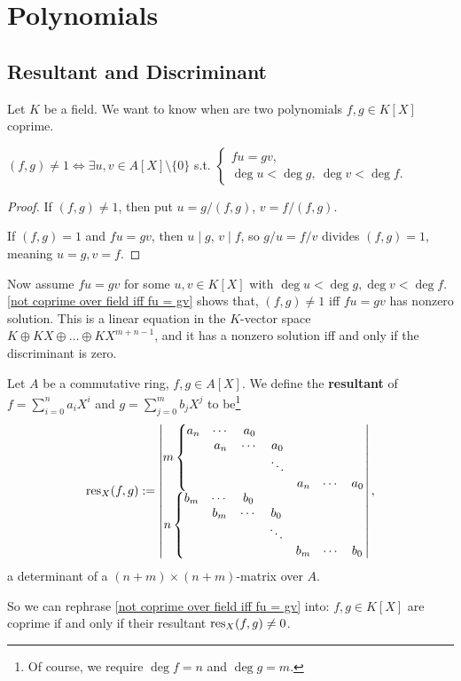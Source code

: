 \section{Polynomials}

\subsection{Resultant and Discriminant}
Let $K$ be a field.
We want to know when are two polynomials $f, g\in K[X]$ coprime.
\begin{lemma}\label{not coprime over field iff fu = gv}
    $(f, g)\ne 1\iff \exists u, v\in A[X]\setminus \{0\}$ s.t. \(\begin{cases}
        fu = gv,\\ 
        \deg u <\deg g,\ \deg v < \deg f.
    \end{cases}\)
\end{lemma}
\begin{proof}
    If $(f, g) \ne 1$, then put $u = g/(f, g)$, $v = f/(f, g)$.

    If $(f, g) = 1$ and $fu = gv$, then $u\mid g$, $v\mid f$, so $g/u = f/v$ divides $(f, g) = 1$,
    meaning $u = g, v = f$.
\end{proof}

Now assume $fu = gv$ for some $u, v\in K[X]$ with $\deg u  < \deg g, \deg v < \deg f$.
\cref{not coprime over field iff fu = gv} shows that, $(f, g)\ne 1$ iff $fu = gv$ has nonzero solution. This is a linear equation in the $K$-vector space $K\oplus KX\oplus\dots\oplus KX^{m+n-1}$, and it has a nonzero solution iff and only if the discriminant is zero.
\begin{definition}
    Let $A$ be a commutative ring, $f, g\in A[X]$.
    We define the \textbf{resultant} of $f = \sum_{i=0}^{n}a_iX^i$ and $g = \sum_{j = 0}^m b_jX^j$ to be\footnote{Of course, we require $\deg f = n$ and $\deg g = m$.} \[\operatorname{res}_X(f, g) := 
\begin{vmatrix}
    m\left\{\begin{matrix}
        a_n & \cdots & a_0 &  &  &  & \\
         & a_n & \cdots &a_0 &  &  & \\ 
         & & & \ddots & & & \\ 
         & &  &  & a_n & \cdots & a_0
    \end{matrix}\right.\\
    n\left\{\begin{matrix}
        b_m & \cdots & b_0 &  &  &  & \\
         & b_m & \cdots &b_0 &  &  & \\ 
         & & & \ddots & & & \\ 
         & &  &  & b_m & \cdots & b_0
    \end{matrix}\right.
\end{vmatrix},\]
    a determinant of a $(n + m)\times (n + m)$-matrix over $A$.
\end{definition}
So we can rephrase \cref{not coprime over field iff fu = gv} into: $f, g\in K[X]$ are coprime if and only if their resultant $\operatorname{res}_X(f, g) \ne 0$.

